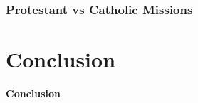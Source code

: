 \documentclass[9pt,letterpaper,subeqn]{beamer}
\begin{document}
\begin{frame}[label=MissionsTab]
\frametitle{Protestant vs Catholic Missions}

\vspace{1cm}
\end{frame}






\section{Conclusion}
\begin{frame}[plain]
\begin{center}
\textbf{Conclusion}
\end{center}
\end{frame}
\end{document}
